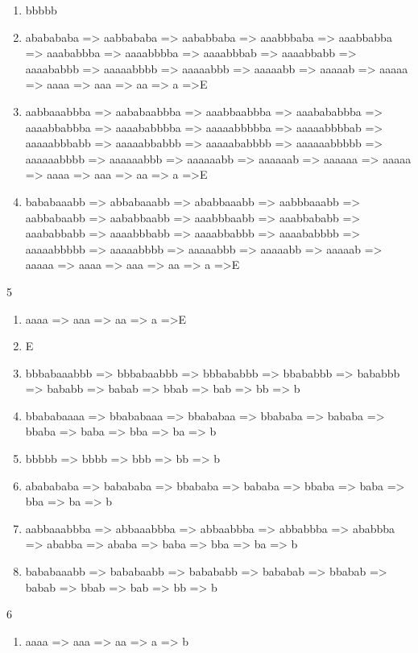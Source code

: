 \documentclass{article}
\begin{document}
\begin{enumerate}
\begin{enumerate}
\item bbbbb

\item ababababa => aabbababa => aababbaba => aaabbbaba => aaabbabba => aaababbba => aaaabbbba => aaaabbbab => aaaabbabb => aaaababbb => aaaaabbbb => aaaaabbb => aaaaabb => aaaaab => aaaaa => aaaa => aaa => aa => a =>E

\item aabbaaabbba => aababaabbba => aaabbaabbba => aaabababbba => aaaabbabbba => aaaababbbba => aaaaabbbbba => aaaaabbbbab => aaaaabbbabb => aaaaabbabbb => aaaaababbbb => aaaaaabbbbb => aaaaaabbbb => aaaaaabbb => aaaaaabb => aaaaaab => aaaaaa => aaaaa => aaaa => aaa => aa => a =>E

\item bababaaabb => abbabaaabb => ababbaaabb => aabbbaaabb => aabbabaabb => aababbaabb => aaabbbaabb => aaabbababb => aaababbabb => aaaabbbabb => aaaabbabbb => aaaababbbb => aaaaabbbbb => aaaaabbbb => aaaaabbb => aaaaabb => aaaaab => aaaaa => aaaa => aaa => aa => a =>E
\end{enumerate}


5

\begin{enumerate}
\item     aaaa => aaa => aa => a =>E

\item E

\item bbbabaaabbb => bbbabaabbb => bbbababbb => bbababbb => bababbb => bababb => babab => bbab => bab => bb => b

\item bbababaaaa => bbababaaa => bbababaa => bbababa => bababa => bbaba => baba => bba => ba => b

\item bbbbb => bbbb => bbb => bb => b

\item ababababa => babababa => bbababa => bababa => bbaba => baba => bba => ba => b

\item aabbaaabbba => abbaaabbba => abbaabbba => abbabbba => ababbba => ababba => ababa => baba => bba => ba => b

\item bababaaabb => bababaabb => babababb => bababab => bbabab => babab => bbab => bab => bb => b
\end{enumerate}


6
\begin{enumerate}
\item aaaa => aaa => aa => a => b


\end{enumerate}
\end{enumerate}
\end{document}
